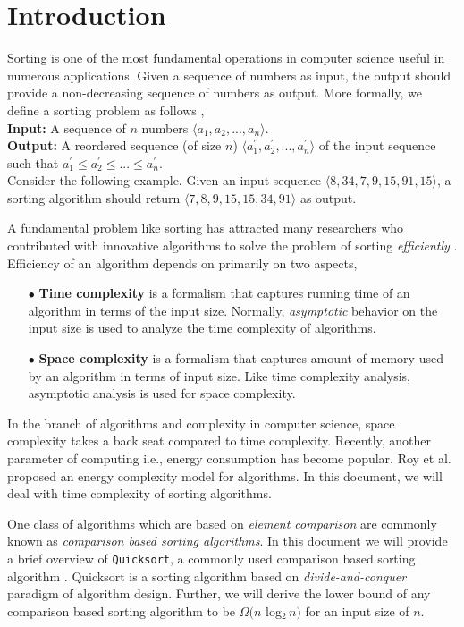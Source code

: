 \documentclass[twocolumn,a4paper]{article}
\begin{document}
    \section{Introduction}
        Sorting is one of the most fundamental operations in computer science useful in numerous applications.
        Given a sequence of numbers as input, the output should provide a non-decreasing sequence of numbers as output.
        More formally, we define a sorting problem as follows \cite{clrs},\\
        \textbf{Input:} A sequence of $n$ numbers $\langle a_1,a_2,...,a_n \rangle$.\\
        \textbf{Output:} A reordered sequence (of size $n$) $\langle a_1^{'},a_2^{'},...,a_n^{'} \rangle$ of the input sequence such that $a_1^{'} \leq a_2^{'} \leq ... \leq a_n^{'}$.\\
        Consider the following example. Given an input sequence $\langle 8,34,7,9,15,91,15 \rangle$, a sorting algorithm should return $\langle 7,8,9,15,15,34,91 \rangle$ as output.\par
            A fundamental problem like sorting has attracted many researchers who contributed with innovative algorithms to solve the problem of sorting \textit{ efficiently} \cite{acm}.
        Efficiency of an algorithm depends on primarily on two aspects,
        \begin{itemize}
            \item[$\bullet$] \textbf{Time complexity} is a formalism that captures running time of an algorithm in terms of the input size.
                Normally, \textit{asymptotic} behavior on the input size is used to analyze the time complexity of algorithms.
            \item[$\bullet$] \textbf{Space complexity} is a formalism that captures amount of memory used by an algorithm in terms of input size.
                Like time complexity analysis, asymptotic analysis is used for space complexity.
        \end{itemize}
        In the branch of algorithms and complexity in computer science, space complexity takes a back seat compared to time complexity.
        Recently, another parameter of computing i.e., energy consumption has become popular.
        Roy et al. \cite{roy} proposed an energy complexity model for algorithms.
        In this document, we will deal with time complexity of sorting algorithms.\par
            One class of algorithms which are based on \textit{element comparison} are commonly known as \textit{comparison based sorting algorithms}.
        In this document we will provide a brief overview of \texttt{Quicksort}, a commonly used comparison based sorting algorithm \cite{hoare}.
        Quicksort is a sorting algorithm based on \textit{divide-and-conquer} paradigm of algorithm design.
        Further, we will derive the lower bound of any comparison based sorting algorithm to be $\Omega(n\!$ log$_2\,n)$ for an input size of $n$.
\end{document}

